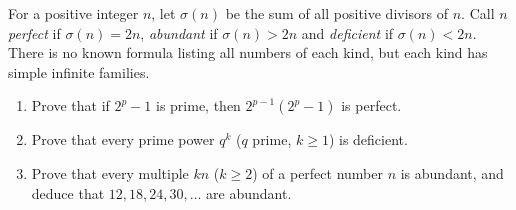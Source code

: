 For a positive integer $n$, let $\sigma(n)$ be the sum of all positive divisors of $n$. Call $n$ \emph{perfect} if $\sigma(n)=2n$, \emph{abundant} if $\sigma(n)>2n$ and \emph{deficient} if $\sigma(n)<2n$. There is no known formula listing all numbers of each kind, but each kind has simple infinite families.
\begin{enumerate}
\item[(a)] Prove that if $2^p-1$ is prime, then $2^{p-1}\left(2^p-1\right)$ is perfect.
\item[(b)] Prove that every prime power $q^k$ ($q$ prime, $k\ge1$) is deficient.
\item[(c)] Prove that every multiple $kn$ ($k\ge2$) of a perfect number $n$ is abundant, and deduce that $12,18,24,30,\ldots$ are abundant.
\end{enumerate}
